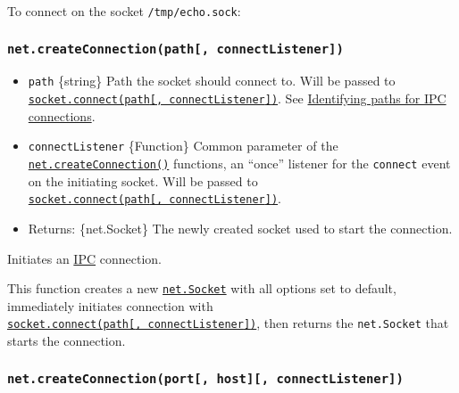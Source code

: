 To connect on the socket \texttt{/tmp/echo.sock}:

\begin{Shaded}
\begin{Highlighting}[]
\OperatorTok{=}\NormalTok{(\{ }\OperatorTok{:} \NormalTok{ \})}\OperatorTok{;}
\end{Highlighting}
\end{Shaded}

\subsubsection{\texorpdfstring{\texttt{net.createConnection(path{[},\ connectListener{]})}}{net.createConnection(path{[}, connectListener{]})}}\label{net.createconnectionpath-connectlistener}

\begin{itemize}
\tightlist
\item
  \texttt{path} \{string\} Path the socket should connect to. Will be
  passed to
  \hyperref[socketconnectpath-connectlistener]{\texttt{socket.connect(path{[},\ connectListener{]})}}.
  See \hyperref[identifying-paths-for-ipc-connections]{Identifying paths
  for IPC connections}.
\item
  \texttt{connectListener} \{Function\} Common parameter of the
  \hyperref[netcreateconnection]{\texttt{net.createConnection()}}
  functions, an ``once'' listener for the
  \texttt{\textquotesingle{}connect\textquotesingle{}} event on the
  initiating socket. Will be passed to
  \hyperref[socketconnectpath-connectlistener]{\texttt{socket.connect(path{[},\ connectListener{]})}}.
\item
  Returns: \{net.Socket\} The newly created socket used to start the
  connection.
\end{itemize}

Initiates an \hyperref[ipc-support]{IPC} connection.

This function creates a new
\hyperref[class-netsocket]{\texttt{net.Socket}} with all options set to
default, immediately initiates connection with
\hyperref[socketconnectpath-connectlistener]{\texttt{socket.connect(path{[},\ connectListener{]})}},
then returns the \texttt{net.Socket} that starts the connection.

\subsubsection{\texorpdfstring{\texttt{net.createConnection(port{[},\ host{]}{[},\ connectListener{]})}}{net.createConnection(port{[}, host{]}{[}, connectListener{]})}}\label{net.createconnectionport-host-connectlistener}


